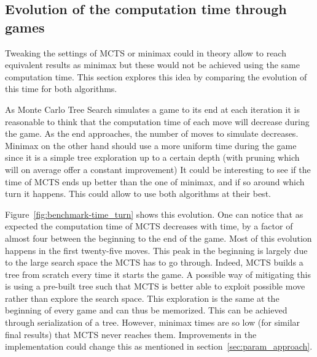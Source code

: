 \subsection{Evolution of the computation time through games}
Tweaking the settings of MCTS or minimax could in theory allow to reach equivalent results as minimax but these would not be achieved using the same computation time.
This section explores this idea by comparing the evolution of this time for both algorithms.

As Monte Carlo Tree Search simulates a game to its end at each iteration it is reasonable to think that the computation
time of each move will decrease during the game.
As the end approaches, the number of moves to simulate decreases.
Minimax on the other hand should use a more uniform time during the game since it is a simple tree exploration up to a certain depth (with pruning which will on average offer a constant improvement)
It could be interesting to see if the time of MCTS ends up better than the one of minimax, and if so around which turn it happens.
This could allow to use both algorithms at their best.

Figure~\ref{fig:benchmark-time_turn} shows this evolution.
One can notice that as expected the computation time of MCTS decreases with time, by a factor of almost four between the beginning to the end of the game.
Most of this evolution happens in the first twenty-five moves.
This peak in the beginning is largely due to the large search space the MCTS has to go through. Indeed, MCTS builds a tree from scratch every time it starts the game. A possible way of mitigating this is using a pre-built tree such that MCTS is better able to exploit possible move rather than explore the search space. This exploration is the same at the beginning of every game and can thus be memorized. This can be achieved through serialization of a tree.
However, minimax times are so low (for similar final results) that MCTS never reaches them. 
Improvements in the implementation could change this as mentioned in section~\ref{sec:param_approach}.


